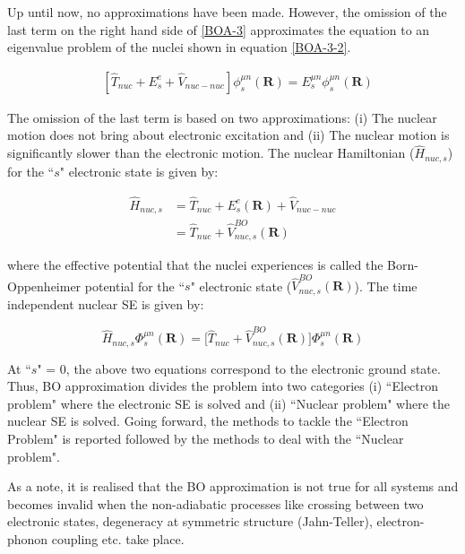 \noindent Up until now, no approximations have been made. However, the omission of the last term on the right hand side of \ref{BOA-3} approximates the equation to an eigenvalue problem of the nuclei shown in equation \ref{BOA-3-2}.

\begin{align}
   \label{BOA-3-2}
   & [\hat{T}_{nuc}+E^{e}_{s}+\hat{V}_{nuc-nuc}] \phi_{s}^{\mu n}(\textbf{R}) = E_{s}^{\mu n} \phi_{s}^{\mu n}(\textbf{R})
\end{align}

\noindent The omission of the last term is based on two approximations: (i) The nuclear motion does not bring about electronic excitation and (ii) The nuclear motion is significantly slower than the electronic motion. The nuclear Hamiltonian ($\hat{H}_{nuc,s}$) for the ``$s$" electronic state is given by:

\begin{align}
    \label{BOA-5}
\hat{H}_{nuc,s}&= \hat{T}_{nuc}+E^{e}_{s}(\textbf{R})+\hat{V}_{nuc-nuc} \\
               &= \hat{T}_{nuc} + \hat{V}^{BO}_{nuc,s}(\textbf{R})
\end{align}


\noindent where the effective potential that the nuclei experiences is called the Born-Oppenheimer potential for the ``$s$" electronic state ($\hat{V}^{BO}_{nuc,s}(\textbf{R})$). The time independent nuclear SE is given by:

\begin{equation}
    \label{BOA-6}
    \hat{H}_{nuc,s}\Phi^{\mu n}_{s}(\textbf{R}) = \big[\hat{T}_{nuc} + \hat{V}^{BO}_{nuc,s}(\textbf{R})\big] \Phi^{\mu n}_{s}(\textbf{R})
\end{equation}

\noindent At ``$s$" = 0, the above two equations correspond to the electronic ground state. \\ 


\noindent Thus, BO approximation  divides the problem into two categories (i) ``Electron problem" where the electronic SE is solved and (ii) ``Nuclear problem" where the nuclear SE is solved. Going forward, the methods to tackle the ``Electron Problem" is reported followed by the methods to deal with the ``Nuclear problem".  
 
\noindent As a note, it is realised that the BO approximation is not true for all systems and becomes invalid when the non-adiabatic processes like crossing between two electronic states, degeneracy at symmetric structure (Jahn-Teller), electron-phonon coupling etc. take place. 
